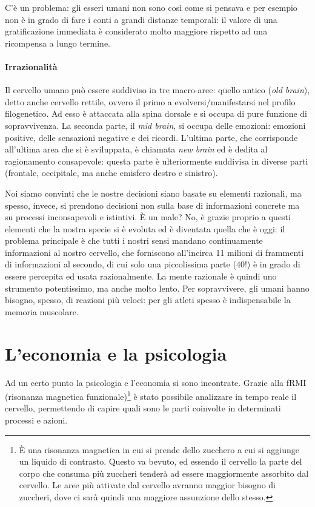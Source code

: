 C'è un problema: gli esseri umani non sono così come si pensava e per esempio
non è in grado di fare i conti a grandi distanze temporali: il valore di una
gratificazione immediata è considerato molto maggiore rispetto ad una
ricompensa a lungo termine.

\paragraph*{Irrazionalità} 
Il cervello umano può essere suddiviso in tre macro-aree: quello
antico (\textit{old brain}), detto anche cervello rettile, ovvero il primo a
evolversi/manifestarsi nel profilo filogenetico. Ad esso è attaccata alla
spina dorsale e si occupa di pure funzione di sopravvivenza.
La seconda parte, il \textit{mid brain}, si occupa delle emozioni: emozioni
positive, delle sensazioni negative e dei ricordi.
L'ultima parte, che corrisponde all'ultima area che si è sviluppata, è chiamata
\textit{new brain} ed è dedita al ragionamento consapevole: questa parte è
ulteriormente suddivisa in diverse parti (frontale, occipitale, ma anche
emisfero destro e sinistro).

Noi siamo convinti che le nostre decisioni siano basate su elementi razionali,
ma spesso, invece, si prendono decisioni non sulla base di informazioni
concrete ma su processi inconsapevoli e istintivi.
È un male? No, è grazie proprio a questi elementi che la nostra specie si è
evoluta ed è diventata quella che è oggi: il problema principale è che tutti i
nostri sensi mandano continuamente informazioni al nostro cervello, che
forniscono all'incirca 11 milioni di frammenti di informazioni al secondo, di
cui solo una piccolissima parte (40!) è in grado di essere percepita ed usata
razionalmente. La mente razionale è quindi uno strumento potentissimo, ma anche
molto lento. Per sopravvivere, gli umani hanno bisogno, spesso, di reazioni più
veloci: per gli atleti spesso è indispensabile la memoria muscolare.

\section{L'economia e la psicologia}

Ad un certo punto la psicologia e l'economia si sono incontrate.
Grazie alla fRMI (risonanza magnetica funzionale)\footnote{È una
risonanza magnetica in cui si prende dello zucchero a cui si aggiunge un
liquido di contrasto. Questo va bevuto, ed essendo il cervello la parte del
corpo che consuma più zuccheri tenderà ad essere maggiormente assorbito dal
cervello. Le aree più attivate dal cervello avranno maggior bisogno di
zuccheri, dove ci sarà quindi una maggiore assunzione dello stesso.} è stato
possibile analizzare in tempo reale il cervello, permettendo di capire quali
sono le parti coinvolte in determinati processi e azioni.

